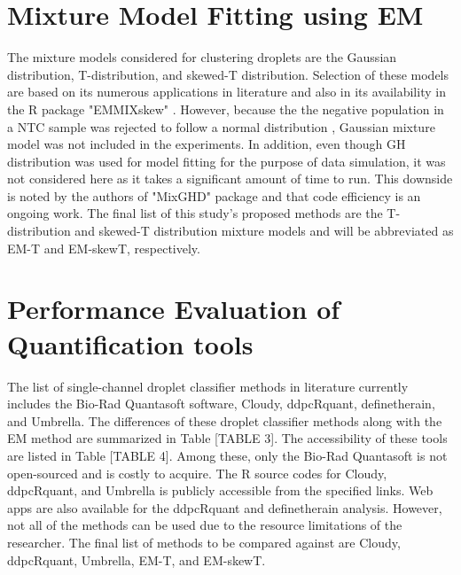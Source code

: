 \section{Mixture Model Fitting using EM}
\label{sec:modelfitting}

The mixture models considered for clustering droplets are the Gaussian distribution, T-distribution, and skewed-T distribution. Selection of these models are based on its numerous applications in literature and also in its availability in the R package "EMMIXskew" \cite{ref:EMMIXSkew}. However, because the the negative population in a NTC sample was rejected to follow a normal distribution \cite{ref:Trypsteen2015, ref:Jacobs2017}, Gaussian mixture model was not included in the experiments. In addition, even though GH distribution was used for model fitting for the purpose of data simulation, it was not considered here as it takes a significant amount of time to run. This downside is noted by the authors of "MixGHD" package and that code efficiency is an ongoing work. The final list of this study's proposed methods are the T-distribution and skewed-T distribution mixture models and will be abbreviated as EM-T and EM-skewT, respectively.

\section{Performance Evaluation of Quantification tools}
\label{sec:performanceeval}

The list of single-channel droplet classifier methods in literature currently includes the Bio-Rad Quantasoft software, Cloudy, ddpcRquant, definetherain, and Umbrella. The differences of these droplet classifier methods along with the EM method are summarized in Table [TABLE 3]. The accessibility of these tools are listed in Table [TABLE 4]. Among these, only the Bio-Rad Quantasoft is not open-sourced and is costly to acquire. The R source codes for Cloudy, ddpcRquant, and Umbrella is publicly accessible from the specified links. Web apps are also available for the ddpcRquant and definetherain analysis. However, not all of the methods can be used due to the resource limitations of the researcher. The final list of methods to be compared against are Cloudy, ddpcRquant, Umbrella, EM-T, and EM-skewT. 



